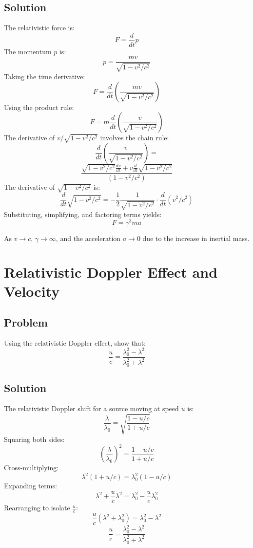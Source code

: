 \documentclass[a4paper,12pt]{article}
\begin{document}
\begin{multicols}{2}
\subsection*{Solution}
The relativistic force is:
\[
F = \frac{d}{dt}p
\]
The momentum \(p\) is:
\[
p = \frac{mv}{\sqrt{1 - v^2/c^2}}
\]
Taking the time derivative:
\[
F = \frac{d}{dt} \left( \frac{mv}{\sqrt{1 - v^2/c^2}} \right)
\]
Using the product rule:
\[
F = m \frac{d}{dt}\left( \frac{v}{\sqrt{1 - v^2/c^2}} \right)
\]
The derivative of \(v/\sqrt{1 - v^2/c^2}\) involves the chain rule:
\[
\frac{d}{dt} \left( \frac{v}{\sqrt{1 - v^2/c^2}} \right) =
\]
\[
\frac{\sqrt{1 - v^2/c^2} \frac{dv}{dt} + v \frac{d}{dt} \sqrt{1 - v^2/c^2}}{(1 - v^2/c^2)}
\]
The derivative of \(\sqrt{1 - v^2/c^2}\) is:
\[
\frac{d}{dt} \sqrt{1 - v^2/c^2} = -\frac{1}{2} \frac{1}{\sqrt{1 - v^2/c^2}} \cdot \frac{d}{dt}(v^2/c^2)
\]
Substituting, simplifying, and factoring terms yields:
\[
F = \gamma^3 ma
\]

As \(v \to c\), \(\gamma \to \infty\), and the acceleration \(a \to 0\) due to the increase in inertial mass.

\section*{Relativistic Doppler Effect and Velocity}

\subsection*{Problem}
Using the relativistic Doppler effect, show that:
\[
\frac{u}{c} = \frac{\lambda_0^2 - \lambda^2}{\lambda_0^2 + \lambda^2}
\]

\subsection*{Solution}
The relativistic Doppler shift for a source moving at speed \(u\) is:
\[
\frac{\lambda}{\lambda_0} = \sqrt{\frac{1 - u/c}{1 + u/c}}
\]
Squaring both sides:
\[
\left( \frac{\lambda}{\lambda_0} \right)^2 = \frac{1 - u/c}{1 + u/c}
\]
Cross-multiplying:
\[
\lambda^2 (1 + u/c) = \lambda_0^2 (1 - u/c)
\]
Expanding terms:
\[
\lambda^2 + \frac{u}{c} \lambda^2 = \lambda_0^2 - \frac{u}{c} \lambda_0^2
\]
Rearranging to isolate \(\frac{u}{c}\):
\[
\frac{u}{c} (\lambda^2 + \lambda_0^2) = \lambda_0^2 - \lambda^2
\]
\[
\frac{u}{c} = \frac{\lambda_0^2 - \lambda^2}{\lambda_0^2 + \lambda^2}
\]
\end{multicols}
\end{document}
